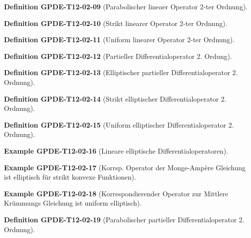 \documentclass[10pt, letterpaper]{article}
\newcommand{\CustomHeading}[3]{%
  \par\medskip\noindent%
  \textbf{#1 #2} \textnormal{(#3)}.\enskip%
}
\newenvironment{DEF}[2]{\CustomHeading{Definition}{#1}{#2}}{}
\newenvironment{EXA}[2]{\CustomHeading{Example}{#1}{#2}}{}
\begin{document}
\begin{DEF}{GPDE-T12-02-09}{Parabolischer lineaer Operator 2-ter Ordnung}
\end{DEF}

\begin{DEF}{GPDE-T12-02-10}{Strikt linearer Operator 2-ter Ordnung}
\end{DEF}

\begin{DEF}{GPDE-T12-02-11}{Uniform linearer Operator 2-ter Ordnung}
\end{DEF}

\begin{DEF}{GPDE-T12-02-12}{Partieller Differentialoperator 2. Ordung}
\end{DEF}

\begin{DEF}{GPDE-T12-02-13}{Elliptischer partieller Differentialoperator 2. Ordnung}
\end{DEF}

\begin{DEF}{GPDE-T12-02-14}{Strikt elliptischer Differentialoperator 2. Ordnung}
\end{DEF}

\begin{DEF}{GPDE-T12-02-15}{Uniform elliptischer Differentialoperator 2. Ordnung}
\end{DEF}

\begin{EXA}{GPDE-T12-02-16}{Lineare elliptische Differentialoperatoren}
\end{EXA}

\begin{EXA}{GPDE-T12-02-17}{Korrsp. Operator der Monge-Ampère Gleichung ist elliptisch für strikt konvexe Funktionen}
\end{EXA}

\begin{EXA}{GPDE-T12-02-18}{Korrespondierender Operator zur Mittlere Krümmungs Gleichung ist uniform elliptisch}
\end{EXA}

\begin{DEF}{GPDE-T12-02-19}{Parabolischer partieller Differentialoperator 2. Ordnung}
\end{DEF}
\end{document}
